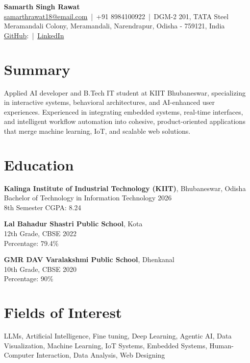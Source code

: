 \documentclass[a4paper,10pt]{article}
\begin{document}
\begin{center}
    {\Huge \textbf{Samarth Singh Rawat}} \\
    \vspace{3pt}
    \href{mailto:samarthrawat18@email.com}{samarthrawat18@email.com} \,|\, +91 8984100922 \,|\, DGM-2 201, TATA Steel Meramandali Colony, Meramandali, Narendrapur, Odisha - 759121, India \\
    \href{https://github.com/gentlewind-alt}{GitHub}: \,|\, 
    \href{https://www.linkedin.com/in/samarth-rawat}{LinkedIn}
\end{center}

\section*{Summary}
Applied AI developer and B.Tech IT student at KIIT Bhubaneswar, specializing in interactive systems, behavioral architectures, and AI-enhanced user experiences. Experienced in integrating embedded systems, real-time interfaces, and intelligent workflow automation into cohesive, product-oriented applications that merge machine learning, IoT, and scalable web solutions.

\section*{Education}
\textbf{Kalinga Institute of Industrial Technology (KIIT)}, Bhubaneswar, Odisha \\
Bachelor of Technology in Information Technology \hfill 2026 \\
8th Semester CGPA: 8.24

\vspace{4pt}
\textbf{Lal Bahadur Shastri Public School}, Kota \\
12th Grade, CBSE \hfill 2022 \\
Percentage: 79.4\%

\vspace{4pt}
\textbf{GMR DAV Varalakshmi Public School}, Dhenkanal \\
10th Grade, CBSE \hfill 2020 \\
Percentage: 90\%

\section*{Fields of Interest}
LLMs, Artificial Intelligence, Fine tuning, Deep Learning, Agentic AI, Data Visualization, Machine Learning, IoT Systems, Embedded Systems, Human-Computer Interaction, Data Analysis, Web Designing
\end{document}
